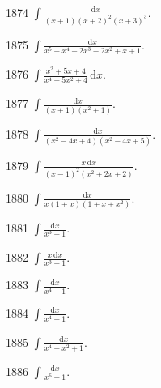 \begin{prob}[S]{1874}
$\int \frac{\mathrm{d}x}{(x + 1)(x + 2)^2 (x + 3)^3}$.
\end{prob}

\begin{prob}[S]{1875}
$\int \frac{\mathrm{d}x}{x^5 + x^4 - 2x^3 - 2x^2 + x + 1}$.
\end{prob}

\begin{prob}[S]{1876}
$\int \frac{x^2 + 5x + 4}{x^4 + 5x^2 + 4}\,\mathrm{d}x$.
\end{prob}

\begin{prob}[S]{1877}
$\int \frac{\mathrm{d}x}{(x + 1)(x^2 + 1)}$.
\end{prob}

\begin{prob}[S]{1878}
$\int \frac{\mathrm{d}x}{(x^2 - 4x + 4)(x^2 - 4x + 5)}$.
\end{prob}

\begin{prob}[S]{1879}
$\int \frac{x\,\mathrm{d}x}{(x - 1)^2 (x^2 + 2x + 2)}$.
\end{prob}

\begin{prob}[S]{1880}
$\int \frac{\mathrm{d}x}{x(1 + x)(1 + x + x^2)}$.
\end{prob}

\begin{prob}[S]{1881}
$\int \frac{\mathrm{d}x}{x^3 + 1}$.
\end{prob}

\begin{prob}[S]{1882}
$\int \frac{x\,\mathrm{d}x}{x^3 - 1}$.
\end{prob}

\begin{prob}[S]{1883}
$\int \frac{\mathrm{d}x}{x^4 - 1}$.
\end{prob}

\begin{prob}[S]{1884}
$\int \frac{\mathrm{d}x}{x^4 + 1}$.
\end{prob}

\begin{prob}[S]{1885}
$\int \frac{\mathrm{d}x}{x^4 + x^2 + 1}$.
\end{prob}

\begin{prob}[S]{1886}
$\int \frac{\mathrm{d}x}{x^6 + 1}$.
\end{prob}

